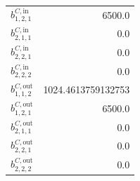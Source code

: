 \documentclass{article}%
\begin{document}
\begin{multicols*}{3}
\begin{supertabular}{lr}
	$b_{1,2,1}^{C,\text{in}}$ & 6500.0 \\%
	$b_{2,1,1}^{C,\text{in}}$ & 0.0 \\%
	$b_{2,2,1}^{C,\text{in}}$ & 0.0 \\%
	$b_{2,2,2}^{C,\text{in}}$ & 0.0 \\%
	$b_{1,1,2}^{C,\text{out}}$ & 1024.4613759132753 \\%
	$b_{1,2,1}^{C,\text{out}}$ & 6500.0 \\%
	$b_{2,1,1}^{C,\text{out}}$ & 0.0 \\%
	$b_{2,2,1}^{C,\text{out}}$ & 0.0 \\%
	$b_{2,2,2}^{C,\text{out}}$ & 0.0 \\%
\end{supertabular}%
\end{multicols*}%
\end{document}
